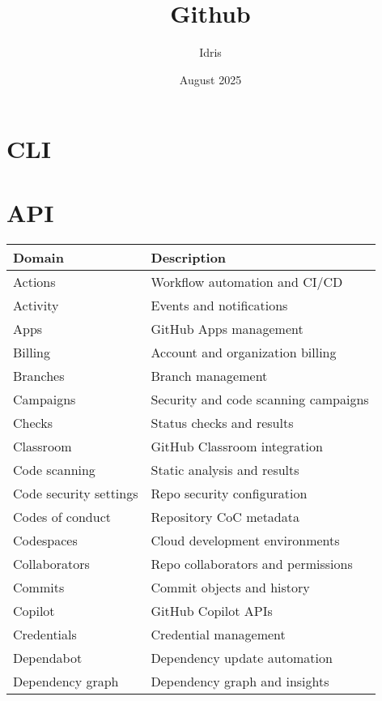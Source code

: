 \documentclass[openany, 12pt]{book}
\title{Github}
\author{Idris}
\date{August 2025}
\begin{document}
\tableofcontents

\part{CLI}

\part{API}

\begin{table}[h]
	\centering
	\begin{tabular}{ll}
		\toprule
		\textbf{Domain}        & \textbf{Description}                 \\
		\midrule
		Actions                & Workflow automation and CI/CD        \\
		Activity               & Events and notifications             \\
		Apps                   & GitHub Apps management               \\
		Billing                & Account and organization billing     \\
		Branches               & Branch management                    \\
		Campaigns              & Security and code scanning campaigns \\
		Checks                 & Status checks and results            \\
		Classroom              & GitHub Classroom integration         \\
		Code scanning          & Static analysis and results          \\
		Code security settings & Repo security configuration          \\
		Codes of conduct       & Repository CoC metadata              \\
		Codespaces             & Cloud development environments       \\
		Collaborators          & Repo collaborators and permissions   \\
		Commits                & Commit objects and history           \\
		Copilot                & GitHub Copilot APIs                  \\
		Credentials            & Credential management                \\
		Dependabot             & Dependency update automation         \\
		Dependency graph       & Dependency graph and insights        \\

\end{tabular}
\end{table}
\end{document}
